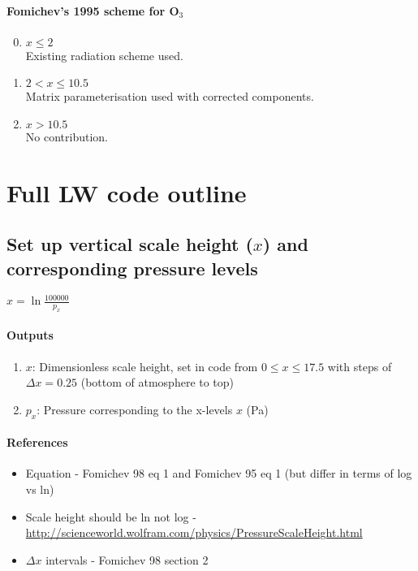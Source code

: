 \paragraph{Fomichev's 1995 scheme for O$_3$}
\begin{enumerate}
\setcounter{enumi}{-1}
\item  $x \leq 2$ \\
   Existing radiation scheme used.
\item  $2 < x \leq 10.5$ \\
   Matrix parameterisation used with corrected components.
\item  $x > 10.5$ \\
   No contribution.
\end{enumerate}

\section{Full LW code outline}

\subsection{Set up vertical scale height ($x$) and corresponding 
  pressure levels}

   $x = \ln \frac{100000}{p_x}$ \\

   \paragraph{Outputs}
   \begin{enumerate}
   \item $x$: Dimensionless scale height, set in code from 
     $0 \leq x \leq 17.5$ with steps of $\Delta x = 0.25$ (bottom of atmosphere 
     to top)
   \item $p_x$: Pressure corresponding to the x-levels $x$ (Pa)
   \end{enumerate}

   \paragraph{References}
   \begin{itemize}
   \item Equation - Fomichev 98 eq 1 and Fomichev 95 eq 1 (but differ
     in terms of log vs ln)
   \item Scale height should be ln not log - \\
     \url{http://scienceworld.wolfram.com/physics/PressureScaleHeight.html}
   \item $\Delta x$ intervals - Fomichev 98 section 2
   \end{itemize}

